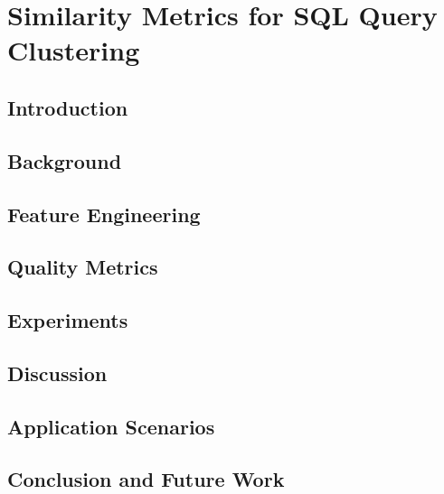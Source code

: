 \chapter{Similarity Metrics for SQL Query Clustering}


\section{Introduction}
\label{sec:introduction}



\section{Background}
\label{sec:background}


\section{Feature Engineering}
\label{sec:system}


\section{Quality Metrics}
\label{sec:dcabench}


\section{Experiments}
\label{sec:experiment}


\section{Discussion}
\label{sec:discussion}


\section{Application Scenarios}
\label{sec:scenarios}


\section{Conclusion and Future Work}
\label{sec:conclusion}
